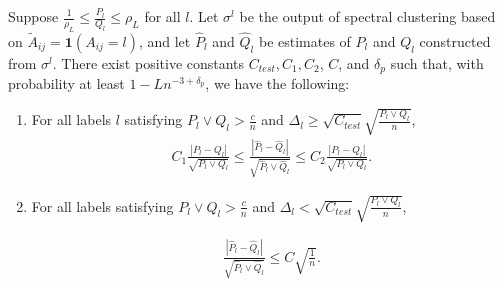 \documentclass{article}
\begin{document}
\begin{proposition}
\label{prop:initial_guarantee}
Suppose $\frac{1}{\rho_L} \leq \frac{P_l}{Q_l} \leq \rho_L$ for all $l$. Let $\sigma^l$ be the output of spectral clustering based on $\tilde{A}_{ij} = \mathbf{1}(A_{ij} = l)$, and let $\hat{P}_l$ and $\hat{Q}_l$ be estimates of $P_l$ and $Q_l$ constructed from $\sigma^l$. There exist positive constants $C_{test}, C_1, C_2$, $C$, and $\delta_p$ such that, with probability at least $1 - Ln^{-3 + \delta_p}$, we have the following:

\begin{enumerate} 
\item For all labels $l$ satisfying $P_l \vee Q_l > \frac{c}{n}$ and $\Delta_l \geq \sqrt{C_{test}} \sqrt{ \frac{P_l \vee Q_l}{n}}$,
\begin{align}
C_1 \frac{ | P_l - Q_l |}{\sqrt{P_l \vee Q_l}}  \leq \frac{ | \hat{P}_l - \hat{Q}_l| }{\sqrt{ \hat{P}_l \vee \hat{Q}_l }} \leq  
C_2 \frac{ | P_l - Q_l | }{\sqrt{ P_l \vee Q_l}}.
\end{align}

\item For all labels satisfying $P_l \vee Q_l > \frac{c}{n}$ and $\Delta_l <  \sqrt{C_{test}} \sqrt{ \frac{P_l \vee Q_l}{n} }$,

\begin{align}
\frac{ | \hat{P}_l - \hat{Q}_l|}{\sqrt{ \hat{P}_l \vee \hat{Q}_l}} \leq C \sqrt{ \frac{1}{n} }.
\label{eqn:bad_l_initialization}
\end{align}
\end{enumerate}
\end{proposition}
\end{document}
